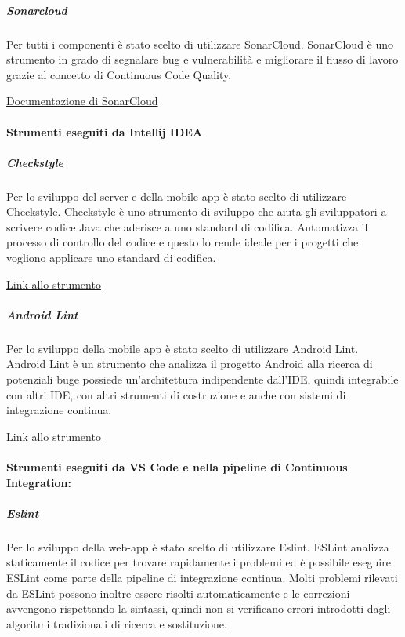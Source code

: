 \documentclass[../../norme-di-progetto.tex]{subfiles}
\begin{document}
\subparagraph{Sonarcloud}%
\label{subp:sonarcloud}
Per tutti i componenti è stato scelto di utilizzare SonarCloud.
SonarCloud è uno strumento in grado di segnalare bug e vulnerabilità e migliorare il flusso di lavoro grazie al concetto di Continuous Code Quality.

\href{https://sonarcloud.io/documentation}{Documentazione di SonarCloud}

\paragraph{Strumenti eseguiti da Intellij IDEA}%
\label{par:strumenti_eseguiti_da_Intellij_IDEA}

\subparagraph{Checkstyle}%
\label{subp:checkstyle}
Per lo sviluppo del server e della mobile app è stato scelto di utilizzare Checkstyle.
Checkstyle è uno strumento di sviluppo che aiuta gli sviluppatori a scrivere codice Java che aderisce a uno standard di codifica. Automatizza il processo di controllo del codice e questo lo rende ideale per i progetti che vogliono applicare uno standard di codifica.

\href{https://checkstyle.sourceforge.io/}{Link allo strumento}

\subparagraph{Android Lint}%
\label{subp:androidlint}
Per lo sviluppo della mobile app è stato scelto di utilizzare Android Lint.
Android Lint è un strumento che analizza il progetto Android alla ricerca di potenziali buge possiede un'architettura indipendente dall'IDE, quindi integrabile con altri IDE, con altri strumenti di costruzione e anche con sistemi di integrazione continua.

\href{https://developer.android.com/studio/write/lint}{Link allo strumento}

\paragraph{Strumenti eseguiti da VS Code e nella pipeline di Continuous Integration:}%
\label{par:strumenti_eseguiti_da_vscode_e_ci}

\subparagraph{Eslint}%
\label{subp:eslint}
Per lo sviluppo della web-app è stato scelto di utilizzare Eslint.
ESLint analizza staticamente il codice per trovare rapidamente i problemi ed è possibile eseguire ESLint come parte della pipeline di integrazione continua. Molti problemi rilevati da ESLint possono inoltre essere risolti automaticamente e le correzioni avvengono rispettando la sintassi, quindi non si verificano errori introdotti dagli algoritmi tradizionali di ricerca e sostituzione.
\end{document}
